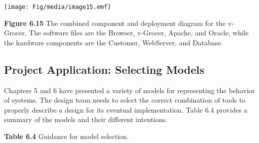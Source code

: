 \texttt{[image: Fig/media/image15.emf]}

\textbf{Figure 6.15} The combined component and deployment diagram for
the v-Grocer. The software files are the Browser, v-Grocer, Apache, and
Oracle, while the hardware components are the Customer, WebServer, and
Database.

\subsection{Project Application: Selecting
Models}\label{project-application-selecting-models}

Chapters 5 and 6 have presented a variety of models for representing the
behavior of systems. The design team needs to select the correct
combination of tools to properly describe a design for its eventual
implementation. Table 6.4 provides a summary of the models and their
different intentions.

\textbf{\hfill\break
Table 6.4} Guidance for model selection.

